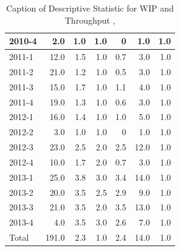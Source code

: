 \documentclass[UKenglish]{ifimaster}  %
\begin{document}
\begin{appendices}
\begin{table}[!htbp]
\begin{adjustwidth}{-2.5cm}{}
{{\begin{tabular}{ | l | r | r | r | r | r | r | }
2010-4 & 2.0 & 1.0 & 1.0 & 0 & 1.0 & 1.0\\ \hline
2011-1 & 12.0 & 1.5 & 1.0 & 0.7 & 3.0 & 1.0\\ \hline
2011-2 & 21.0 & 1.2 & 1.0 & 0.5 & 3.0 & 1.0\\ \hline
2011-3 & 15.0 & 1.7 & 1.0 & 1.1 & 4.0 & 1.0\\ \hline
2011-4 & 19.0 & 1.3 & 1.0 & 0.6 & 3.0 & 1.0\\ \hline
2012-1 & 16.0 & 1.4 & 1.0 & 1.0 & 5.0 & 1.0\\ \hline
2012-2 & 3.0 & 1.0 & 1.0 & 0 & 1.0 & 1.0\\ \hline
2012-3 & 23.0 & 2.5 & 2.0 & 2.5 & 12.0 & 1.0\\ \hline
2012-4 & 10.0 & 1.7 & 2.0 & 0.7 & 3.0 & 1.0\\ \hline
2013-1 & 25.0 & 3.8 & 3.0 & 3.4 & 14.0 & 1.0\\ \hline
2013-2 & 20.0 & 3.5 & 2.5 & 2.9 & 9.0 & 1.0\\ \hline
2013-3 & 21.0 & 3.5 & 2.0 & 3.5 & 13.0 & 1.0\\ \hline
2013-4 & 4.0 & 3.5 & 3.0 & 2.6 & 7.0 & 1.0\\ \hline
Total & 191.0 & 2.3 & 1.0 & 2.4 & 14.0 & 1.0\\ \hline
\end{tabular}
}
}
\end{adjustwidth}
\caption[Optional caption for list of figures]{Caption of Descriptive Statistic for WIP and Throughput  , }
\label{DS:8:1}
\end{table}


\end{appendices}
\end{document}
